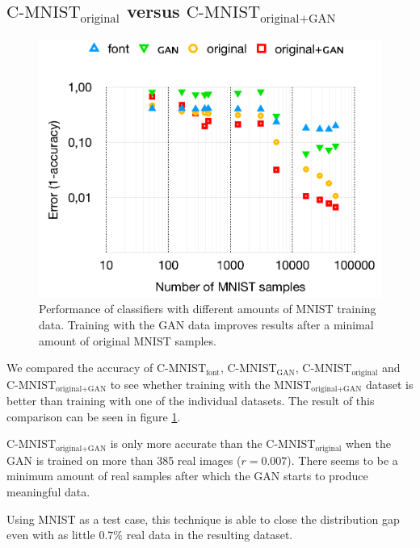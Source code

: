 \documentclass[10pt,twocolumn,letterpaper]{article}
\begin{document}
\subsection{\boldmath\bfseries $\text{C-MNIST}_\text{original}$ versus $\text{C-MNIST}_\text{original+GAN}$}
\begin{figure}[h]
\begin{center}
	\includegraphics[width=0.9\linewidth]{../graph-results.png}
\end{center}
   \caption{Performance of classifiers with different amounts of MNIST training data. Training with the GAN data improves results after a minimal amount of original MNIST samples.}
\label{fig:graph-results}
\end{figure}


We compared the accuracy of $\text{C-MNIST}_\text{font}$, $\text{C-MNIST}_\text{GAN}$, $\text{C-MNIST}_\text{original}$ and $\text{C-MNIST}_\text{original+GAN}$ to see whether training with the $\text{MNIST}_\text{original+GAN}$ dataset is better than training with one of the individual datasets. The result of this comparison can be seen in figure \ref{fig:graph-results}.


$\text{C-MNIST}_\text{original+GAN}$ is only more accurate than the $\text{C-MNIST}_\text{original}$ when the GAN is trained on more than 385 real images ($r = 0.007$). There seems to be a minimum amount of real samples after which the GAN starts to produce meaningful data.

Using MNIST as a test case, this technique is able to close the distribution gap even with as little $0.7\%$ real data in the resulting dataset.
\end{document}
